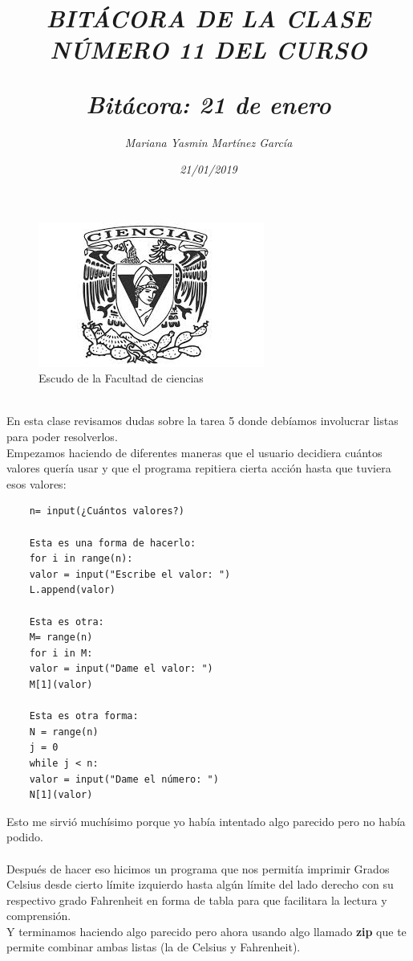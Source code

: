 \documentclass{article}
\title{\Huge\item\color{purple}\textit{BITÁCORA DE LA CLASE NÚMERO 11 DEL CURSO}}
\author{\Large\textit{ Mariana Yasmin Martínez García}}
\date{\Large\textit{ 21/01/2019}}
\begin{document}
\begin{figure}[t]
	\centering
	\includegraphics[width=0.8\linewidth]{Imagenes/1}
	\caption{Escudo de la Facultad de ciencias}
	\label{fig:1}
\end{figure}
	\maketitle
		
	\newpage
	
	\title{\Huge\textbf{\color{purple}\textit{Bitácora: 21 de enero\\}}} \\
	En esta clase revisamos dudas sobre la tarea 5 donde debíamos involucrar listas para poder resolverlos. \\
	Empezamos haciendo de diferentes maneras que el usuario decidiera cuántos valores quería usar y que el programa repitiera cierta acción hasta que tuviera esos valores:
	\begin{verbatim}
	n= input(¿Cuántos valores?)
	
	Esta es una forma de hacerlo:
	for i in range(n):
	valor = input("Escribe el valor: ")
	L.append(valor)
	
	Esta es otra:
	M= range(n)
	for i in M:
	valor = input("Dame el valor: ")
	M[1](valor)
	
	Esta es otra forma:
	N = range(n)
	j = 0
	while j < n:
	valor = input("Dame el número: ")
	N[1](valor)
	\end{verbatim}
Esto me sirvió muchísimo porque yo había intentado algo parecido pero no había podido. \\ \\
Después de hacer eso hicimos un programa que nos permitía imprimir Grados Celsius desde cierto límite izquierdo hasta algún límite del lado derecho con su respectivo grado Fahrenheit en forma de tabla para que facilitara la lectura y comprensión. \\
Y terminamos haciendo algo parecido pero ahora usando algo llamado \textbf{zip} que te permite combinar ambas listas (la de Celsius y Fahrenheit).
\end{document}
